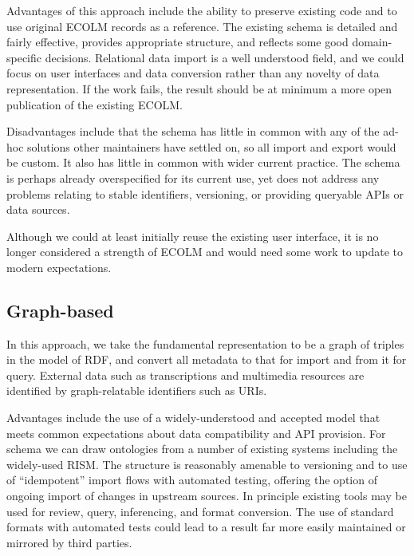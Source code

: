 \documentclass[sigconf, nonacm=true]{acmart}
\begin{document}
\begin{sloppypar}
  Advantages of this approach include the ability to preserve existing
  code and to use original ECOLM records as a reference. The existing
  schema is detailed and fairly effective, provides appropriate
  structure, and reflects some good domain-specific
  decisions. Relational data import is a well understood field, and we
  could focus on user interfaces and data conversion rather than any
  novelty of data representation. If the work fails, the result should
  be at minimum a more open publication of the existing ECOLM.

  Disadvantages include that the schema has little in common with any
  of the ad-hoc solutions other maintainers have settled on, so all
  import and export would be custom. It also has little in common with
  wider current practice. The schema is perhaps already overspecified
  for its current use, yet does not address any problems relating to
  stable identifiers, versioning, or providing queryable APIs or data
  sources.

  Although we could at least initially reuse the existing user
  interface, it is no longer considered a strength of ECOLM and would
  need some work to update to modern expectations.

  \subsection{Graph-based}

  In this approach, we take the fundamental representation to be a
  graph of triples in the model of RDF, and convert all metadata to
  that for import and from it for query. External data such as
  transcriptions and multimedia resources are identified by
  graph-relatable identifiers such as URIs.

  Advantages include the use of a widely-understood and accepted model
  that meets common expectations about data compatibility and API
  provision. For schema we can draw ontologies from a number of
  existing systems including the widely-used RISM. The structure is
  reasonably amenable to versioning and to use of ``idempotent''
  import flows with automated testing, offering the option of ongoing
  import of changes in upstream sources. In principle existing tools
  may be used for review, query, inferencing, and format
  conversion. The use of standard formats with automated tests could
  lead to a result far more easily maintained or mirrored by third
  parties.


\end{sloppypar}
\end{document}
